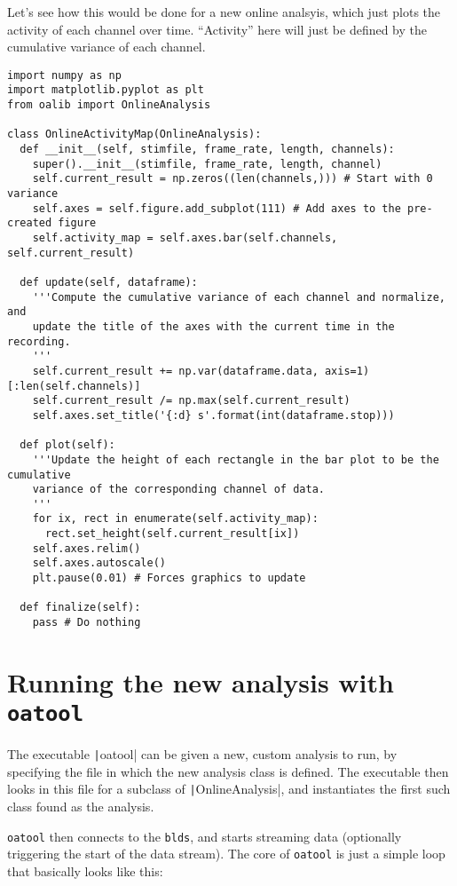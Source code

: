 \documentclass[12pt]{article}
\begin{document}
Let's see how this would be done for a new online analsyis, which just plots
the activity of each channel over time. ``Activity'' here will just be defined
by the cumulative variance of each channel.

\begin{verbatim}
import numpy as np
import matplotlib.pyplot as plt
from oalib import OnlineAnalysis

class OnlineActivityMap(OnlineAnalysis):
  def __init__(self, stimfile, frame_rate, length, channels):
    super().__init__(stimfile, frame_rate, length, channel)
    self.current_result = np.zeros((len(channels,))) # Start with 0 variance
    self.axes = self.figure.add_subplot(111) # Add axes to the pre-created figure
    self.activity_map = self.axes.bar(self.channels, self.current_result)

  def update(self, dataframe):
    '''Compute the cumulative variance of each channel and normalize, and
    update the title of the axes with the current time in the recording.
    '''
    self.current_result += np.var(dataframe.data, axis=1)[:len(self.channels)]
    self.current_result /= np.max(self.current_result)
    self.axes.set_title('{:d} s'.format(int(dataframe.stop)))

  def plot(self):
    '''Update the height of each rectangle in the bar plot to be the cumulative
    variance of the corresponding channel of data.
    '''
    for ix, rect in enumerate(self.activity_map):
      rect.set_height(self.current_result[ix])
    self.axes.relim()
    self.axes.autoscale()
    plt.pause(0.01) # Forces graphics to update

  def finalize(self):
    pass # Do nothing
\end{verbatim}

\section*{Running the new analysis with \texttt{oatool}}

The executable \texttt|oatool| can be given a new, custom analysis
to run, by specifying the file in which the new analysis class is defined. The
executable then looks in this file for a subclass of \texttt|OnlineAnalysis|,
and instantiates the first such class found as the analysis.

\texttt{oatool} then connects to the \texttt{blds}, and starts streaming data (optionally
triggering the start of the data stream). The core of \texttt{oatool} is just a simple
loop that basically looks like this:
\end{document}
